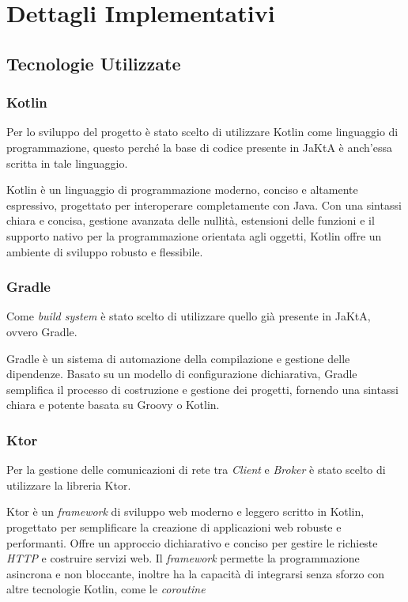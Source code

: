 \section{Dettagli Implementativi}

\subsection{Tecnologie Utilizzate}

\subsubsection{Kotlin}

Per lo sviluppo del progetto è stato scelto di utilizzare Kotlin\cite{kotlin} come linguaggio di programmazione, questo perché la base di codice presente in JaKtA è anch'essa scritta in tale linguaggio.

Kotlin è un linguaggio di programmazione moderno, conciso e altamente espressivo, progettato per interoperare completamente con Java\cite{java}.
Con una sintassi chiara e concisa, gestione avanzata delle nullità, estensioni delle funzioni e il supporto nativo per la programmazione orientata agli oggetti, Kotlin offre un ambiente di sviluppo robusto e flessibile.

\subsubsection{Gradle}

Come \textit{build system} è stato scelto di utilizzare quello già presente in JaKtA, ovvero Gradle\cite{gradle}.

Gradle è un sistema di automazione della compilazione e gestione delle dipendenze. Basato su un modello di configurazione dichiarativa, Gradle semplifica il processo di costruzione e gestione dei progetti, fornendo una sintassi chiara e potente basata su Groovy\cite{groovy} o Kotlin.

\subsubsection{Ktor}

Per la gestione delle comunicazioni di rete tra \textit{Client} e \textit{Broker} è stato scelto di utilizzare la libreria Ktor\cite{ktor}.

Ktor è un \textit{framework} di sviluppo web moderno e leggero scritto in Kotlin, progettato per semplificare la creazione di applicazioni web robuste e performanti. Offre un approccio dichiarativo e conciso per gestire le richieste \textit{HTTP} e costruire servizi web. Il \textit{framework} permette la programmazione asincrona e non bloccante, inoltre ha la capacità di integrarsi senza sforzo con altre tecnologie Kotlin, come le \textit{coroutine}

